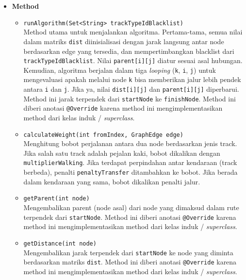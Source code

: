\begin{itemize}
    \item \textbf{Method}
    \begin{itemize}
        \item \texttt{runAlgorithm(Set<String> trackTypeIdBlacklist)}
        \\ Method utama untuk menjalankan algoritma. Pertama-tama, semua nilai dalam matriks \texttt{dist} diinisialisasi dengan jarak langsung antar node berdasarkan edge yang tersedia, dan mempertimbangkan blacklist dari \texttt{trackTypeIdBlacklist}. Nilai \texttt{parent[i][j]} diatur sesuai asal hubungan. Kemudian, algoritma berjalan dalam tiga \textit{looping} (\texttt{k}, \texttt{i}, \texttt{j}) untuk mengevaluasi apakah melalui node \texttt{k} bisa memberikan jalur lebih pendek antara \texttt{i} dan \texttt{j}. Jika ya, nilai \texttt{dist[i][j]} dan \texttt{parent[i][j]} diperbarui. Method ini jarak terpendek dari \texttt{startNode} ke \texttt{finishNode}. Method ini diberi anotasi \texttt{@Override} karena method ini mengimplementasikan method dari kelas induk / \textit{superclass}.
\newpage
        \item \texttt{calculateWeight(int fromIndex, GraphEdge edge)}
        \\ Menghitung bobot perjalanan antara dua node berdasarkan jenis track. Jika salah satu track adalah pejalan kaki, bobot dikalikan dengan \texttt{multiplierWalking}. Jika terdapat perpindahan antar kendaraan (track berbeda), penalti \texttt{penaltyTransfer} ditambahkan ke bobot. Jika berada dalam kendaraan yang sama, bobot dikalikan penalti jalur.

        \item \texttt{getParent(int node)}
        \\ Mengembalikan parent (node asal) dari node yang dimaksud dalam rute terpendek dari \texttt{startNode}. Method ini diberi anotasi \texttt{@Override} karena method ini mengimplementasikan method dari kelas induk / \textit{superclass}.

        \item \texttt{getDistance(int node)}
        \\ Mengembalikan jarak terpendek dari \texttt{startNode} ke node yang diminta berdasarkan matriks \texttt{dist}. Method ini diberi anotasi \texttt{@Override} karena method ini mengimplementasikan method dari kelas induk / \textit{superclass}.
    \end{itemize}
\end{itemize}

